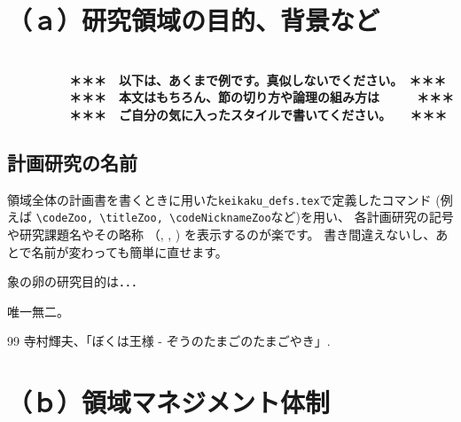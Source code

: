 \documentclass[11pt,a4j,dvipdfmx]{jarticle} 					%
\newcommand{\研究課題名}{象の卵}
\newcommand{\研究機関名}{逢坂大学}
\newcommand{\研究代表者氏名}{湯川秀樹}
\newcommand{\研究期間の最終元号年度}{7}  %
\begin{document}

\section{（ａ）研究領域の目的、背景など}

\JSPSInstructions	%

\textbf{\\　　　　　＊＊＊　以下は、あくまで例です。真似しないでください。　＊＊＊\\
　　　　　＊＊＊　本文はもちろん、節の切り方や論理の組み方は　　　＊＊＊\\
　　　　　＊＊＊　ご自分の気に入ったスタイルで書いてください。　　＊＊＊}

\subsection{計画研究の名前}
        領域全体の計画書を書くときに用いた\texttt{keikaku\_defs.tex}で定義したコマンド
        (例えば
        \texttt{\textbackslash codeZoo, \textbackslash titleZoo, \textbackslash codeNicknameZoo}など)を用い、
        各計画研究の記号や研究課題名やその略称
        （\codeZoo, \titleZoo, \codeNicknameZoo)
        を表示するのが楽です。
       書き間違えないし、あとで名前が変わっても簡単に直せます。

	 象の卵の研究目的は．．．

	唯一無二。




	\vspace{1cm}
	\begin{thebibliography}{99}
		 寺村輝夫、「ぼくは王様 - ぞうのたまごのたまごやき」.
	\end{thebibliography}




\section{（ｂ）領域マネジメント体制}
\end{document}
